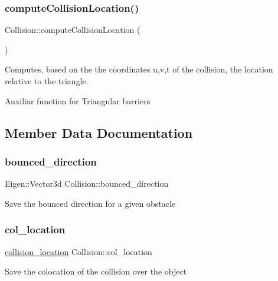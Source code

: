 \subsubsection{\texorpdfstring{compute\+Collision\+Location()}{computeCollisionLocation()}}
{\footnotesize\ttfamily Collision\+::compute\+Collision\+Location (\begin{DoxyParamCaption}{ }\end{DoxyParamCaption})}



Computes, based on the the coordinates u,v,t of the collision, the location relative to the triangle. 

Auxiliar function for Triangular barriers 

\subsection{Member Data Documentation}
\mbox{\label{class_collision_aee20b80597eeea9b0c5a3ff0a5d0c81c}} 
\subsubsection{\texorpdfstring{bounced\+\_\+direction}{bounced\_direction}}
{\footnotesize\ttfamily Eigen\+::\+Vector3d Collision\+::bounced\+\_\+direction}

Save the bounced direction for a given obstacle \mbox{\label{class_collision_ae35c71ff91ffc9c253a345f0b4e2fbba}} 
\subsubsection{\texorpdfstring{col\+\_\+location}{col\_location}}
{\footnotesize\ttfamily \hyperlink{class_collision_aad433eb4e51dbfd7ab9bbe188fbe47ab}{collision\+\_\+location} Collision\+::col\+\_\+location}

Save the colocation of the collision over the object \mbox{\label{class_collision_a00d821761200316e1d54eace02c725b4}} 
